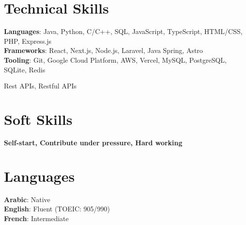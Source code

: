 \documentclass[letterpaper,11pt]{article}
\begin{document}
\section{Technical Skills}
 \begin{itemize}[leftmargin=0.15in, label={}]
    \small{\item{
     \textbf{Languages}{: Java, Python, C/C++, SQL, JavaScript, TypeScript, HTML/CSS, PHP, Express.js} \\
     \textbf{Frameworks}{: React, Next.js, Node.js, Laravel, Java Spring, Astro} \\
     \textbf{Tooling}{: Git, Google Cloud Platform, AWS, Vercel, MySQL, PostgreSQL, SQLite, Redis} \\
    }}
    \small {Rest APIs, Restful APIs }\\
 \end{itemize}

%

\section{Soft Skills}
 \begin{itemize}[leftmargin=0.15in, label={}]
    \small{\item{
     \textbf{Self-start, Contribute under pressure, Hard working} \\
     
    }}
 \end{itemize}

%

\section{Languages}
 \begin{itemize}[leftmargin=0.15in, label={}]
    \small{\item{
     \textbf{Arabic}{: Native} \\
     \textbf{English}{: Fluent (TOEIC: 905/990)} \\
     \textbf{French}{: Intermediate} \\
    }}
 \end{itemize}
 
\end{document}
